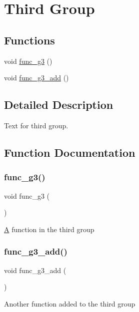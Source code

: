 \hypertarget{group__g3}{}\section{Third Group}
\label{group__g3}
\subsection*{Functions}
\begin{DoxyCompactItemize}
\item 
void \mbox{\hyperlink{group__g3_ga59de48fb40aec5ee2623cc453fe71643}{func\+\_\+g3}} ()
\item 
void \mbox{\hyperlink{group__g3_gaf32d23522a5d9c3e7fed3dd5710001f7}{func\+\_\+g3\+\_\+add}} ()
\end{DoxyCompactItemize}


\subsection{Detailed Description}
Text for third group. 

\subsection{Function Documentation}
\mbox{\label{group__g3_ga59de48fb40aec5ee2623cc453fe71643}} 
\subsubsection{\texorpdfstring{func\_g3()}{func\_g3()}}
{\footnotesize\ttfamily void func\+\_\+g3 (\begin{DoxyParamCaption}{ }\end{DoxyParamCaption})}

\mbox{\hyperlink{class_a}{A}} function in the third group \mbox{\label{group__g3_gaf32d23522a5d9c3e7fed3dd5710001f7}} 
\subsubsection{\texorpdfstring{func\_g3\_add()}{func\_g3\_add()}}
{\footnotesize\ttfamily void func\+\_\+g3\+\_\+add (\begin{DoxyParamCaption}{ }\end{DoxyParamCaption})}

Another function added to the third group 